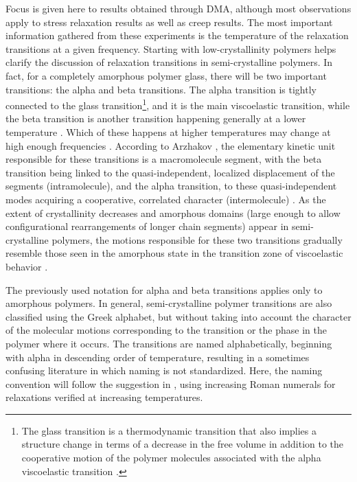 Focus is given here to results obtained through DMA, although most observations apply to stress relaxation results as well as creep results.
The most important information gathered from these experiments is the temperature of the relaxation transitions at a given frequency.
Starting with low-crystallinity polymers helps clarify the discussion of relaxation transitions in semi-crystalline polymers.
In fact, for a completely amorphous polymer glass, there will be two important transitions: the alpha and beta transitions.
The alpha transition is tightly connected to the glass transition\footnote{The glass transition is a thermodynamic transition that also implies a structure change in terms of a decrease in the free volume in addition to the cooperative motion of the polymer molecules associated with the alpha viscoelastic transition \citep{arzhakovRelaxationPhysicalMechanical2019}.}, and it is the main viscoelastic transition, while the beta transition is another transition happening generally at a lower temperature \citep{arzhakovRelaxationPhysicalMechanical2019}.
Which of these happens at higher temperatures may change at high enough frequencies \citep{matsuokaThermodynamicTheoryViscoelasticity1996}.
According to Arzhakov \citep{arzhakovRelaxationPhysicalMechanical2019}, the elementary kinetic unit responsible for these transitions is a macromolecule segment, with the beta transition being linked to the quasi-independent, localized displacement of the segments (intramolecule), and the alpha transition, to these quasi-independent modes acquiring a cooperative, correlated character (intermolecule) \citep{bershteinGeneralMechanismTransition1985, matsuokaThermodynamicTheoryViscoelasticity1996}.
As the extent of crystallinity decreases and amorphous domains (large enough to allow configurational rearrangements of longer chain segments) appear in semi-crystalline polymers, the motions responsible for these two transitions gradually resemble those seen in the amorphous state in the transition zone of viscoelastic behavior \citep{ferryViscoelasticPropertiesPolymers1980}.

The previously used notation for alpha and beta transitions applies only to amorphous polymers.
In general, semi-crystalline polymer transitions are also classified using the Greek alphabet, but without taking into account the character of the molecular motions corresponding to the transition or the phase in the polymer where it occurs.
The transitions are named alphabetically, beginning with alpha in descending order of temperature, resulting in a sometimes confusing literature in which naming is not standardized.
Here, the naming convention will follow the suggestion in \cite{arzhakovRelaxationPhysicalMechanical2019}, using increasing Roman numerals for relaxations verified at increasing temperatures.

